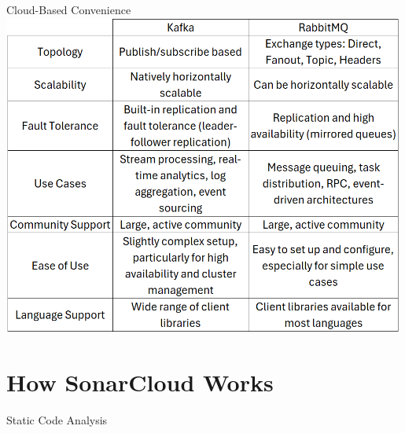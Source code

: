 \documentclass{beamer}
\begin{document}
\begin{frame}{Cloud-Based Convenience}
  \includegraphics[width=0.99\textwidth]{fig/vs2.png}
\end{frame}


\section[How SonarCloud Works]{How SonarCloud Works}

\begin{frame}{Static Code Analysis}
\end{frame}
\end{document}
